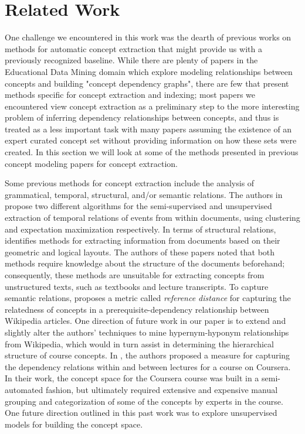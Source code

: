 \section{Related Work}
One challenge we encountered in this work was the dearth of previous works on methods for automatic concept extraction that might provide us with a previously recognized baseline. While there are plenty of papers in the Educational Data Mining domain which explore modeling relationships between concepts and building "concept dependency graphs", there are few that present methods specific for concept extraction and indexing; most papers we encountered view concept extraction as a preliminary step to the more interesting problem of inferring dependency relationships between concepts, and thus is treated as a less important task with many papers assuming the existence of an expert curated concept set without providing information on how these sets were created. In this section we will look at some of the methods presented in previous concept modeling papers for concept extraction.

Some previous methods for concept extraction include the analysis of grammatical, temporal, structural, and/or semantic relations. 
The authors in \cite{Mirroshandel:12} propose two different algorithms for the semi-supervised and unsupervised extraction of temporal relations of events from within documents, using clustering and expectation maximization respectively. In terms of structural relations, \cite{Paass:11} identifies methods for extracting information from documents based on their geometric and logical layouts. The authors of these papers noted that both methods require knowledge about the structure of the documents beforehand; consequently, these methods are unsuitable for extracting concepts from unstructured texts, such as textbooks and lecture transcripts.
To capture semantic relations, \cite{Liang:15} proposes a metric called \textit{reference distance} for capturing the relatedness of concepts in a prerequisite-dependency relationship between Wikipedia articles. One direction of future work in our paper is to extend and slightly alter the authors' techniques to mine hypernym-hyponym relationships from Wikipedia, which would in turn assist in determining the hierarchical structure of course concepts.
In \cite{AlSaad}, the authors proposed a measure for capturing the dependency relations within and between lectures for a course on Coursera. In their work, the concept space for the Coursera course was built in a semi-automated fashion, but ultimately required extensive and expensive manual grouping and categorization of some of the concepts by experts in the course. One future direction outlined in this past work was to explore unsupervised models for building the concept space.

